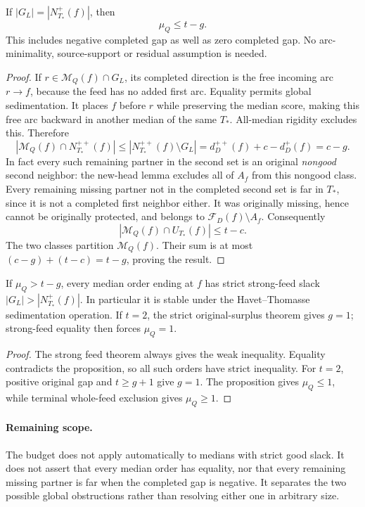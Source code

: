 \begin{proposition}
\label{prop:closure-strong-feed-equality-degree-budget}
If $|G_L|=|N_{T_*}^+(f)|$, then
\[
 \mu_Q\le t-g.
\]
This includes negative completed gap as well as zero completed gap.
No arc-minimality, source-support or residual assumption is needed.
\end{proposition}
\begin{proof}
If $r\in\mathcal M_Q(f)\cap G_L$, its completed direction is the
free incoming arc $r\to f$, because the feed has no added first arc.
Equality permits global sedimentation. It places $f$ before $r$
while preserving the median score, making this free arc backward in
another median of the same $T_*$. All-median rigidity excludes this.
Therefore
\[
 |\mathcal M_Q(f)\cap N_{T_*}^{++}(f)|
 \le |N_{T_*}^{++}(f)\setminus G_L|
=d_D^{++}(f)+c-d_D^+(f)=c-g.
\]
In fact every such remaining partner in the second set is an original
\emph{nongood} second neighbor: the new-head lemma excludes all of
$A_f$ from this nongood class.
Every remaining missing partner not in the completed second set is
far in $T_*$, since it is not a completed first neighbor either.
It was originally missing, hence cannot be originally protected,
and belongs to $\mathcal F_D(f)\setminus A_f$. Consequently
\[
 |\mathcal M_Q(f)\cap U_{T_*}(f)|\le t-c.
\]
The two classes partition $\mathcal M_Q(f)$. Their sum is at most
$(c-g)+(t-c)=t-g$, proving the result.
\end{proof}

\begin{corollary}
\label{cor:closure-large-degree-strong-good-slack}
If $\mu_Q>t-g$, every median order ending at $f$ has strict strong-feed
slack $|G_L|>|N_{T_*}^+(f)|$. In particular it is stable under the
Havet--Thomasse sedimentation operation.
If $t=2$, the strict original-surplus theorem gives $g=1$;
strong-feed equality then forces $\mu_Q=1$.
\end{corollary}
\begin{proof}
The strong feed theorem always gives the weak inequality. Equality
contradicts the proposition, so all such orders have strict inequality.
For $t=2$, positive original gap and $t\ge g+1$ give $g=1$.
The proposition gives $\mu_Q\le1$, while terminal whole-feed exclusion
gives $\mu_Q\ge1$.
\end{proof}

\paragraph{Remaining scope.}
The budget does not apply automatically to medians with strict good
slack. It does not assert that every median order has equality, nor
that every remaining missing partner is far when the completed gap is
negative. It separates the two possible global obstructions rather
than resolving either one in arbitrary size.
